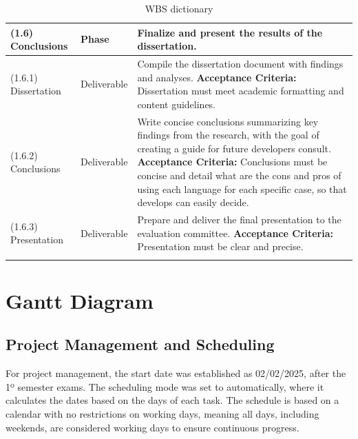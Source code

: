 \begin{longtable}{|p{3cm}|p{2.5cm}|p{8cm}|}
      (1.6) Conclusions              & Phase                 & Finalize and present the results of the dissertation.                                                                                                                                                                                                                                                                                                     \\ \hline
      (1.6.1) Dissertation           & Deliverable           & Compile the dissertation document with findings and analyses. \newline \textbf{Acceptance Criteria:} Dissertation must meet academic formatting and content guidelines.                                                                                                                                                                                   \\ \hline
      (1.6.2) Conclusions            & Deliverable           & Write concise conclusions summarizing key findings from the research, with the goal of creating a guide for future developers consult. \newline \textbf{Acceptance Criteria:} Conclusions must be concise and detail what are the cons and pros of using each language for each specific case, so that develops can easily decide.                        \\ \hline
      (1.6.3) Presentation           & Deliverable           & Prepare and deliver the final presentation to the evaluation committee. \newline \textbf{Acceptance Criteria:} Presentation must be clear and precise.                                                                                                                                                                                                    \\ \hline
      \caption{WBS dictionary}
\end{longtable}

\section{Gantt Diagram}

\subsection{Project Management and Scheduling}

For project management, the start date was established as 02/02/2025, after the 1º semester exams. The scheduling mode was set to automatically, where it calculates the dates based on the days of each task. The schedule is based on a calendar with no restrictions on working days, meaning all days, including weekends, are considered working days to ensure continuous progress.

